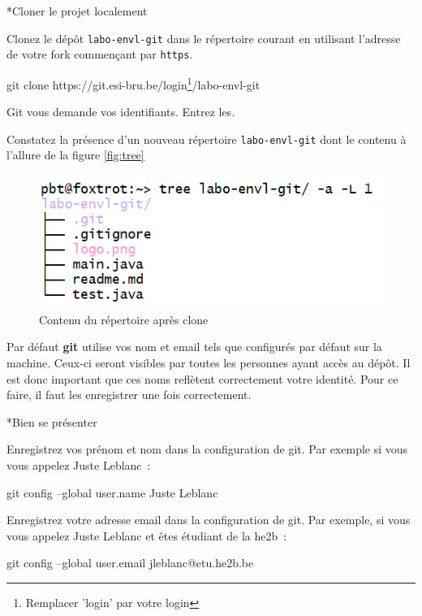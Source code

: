 \documentclass[a4paper,11pt]{style-esi/td}
\newcommand{\git}{\textbf{git }}
\begin{document}
\begin{Exercice}*{Cloner le projet localement}
	\begin{steps}
		
	\item Clonez le dépôt \texttt{labo-envl-git} dans le répertoire courant en
		utilisant l'adresse de votre fork commençant par \texttt{https}. 

		\begin{term}
			git clone https://git.esi-bru.be/login\footnote{Remplacer 'login' par votre login}/labo-envl-git
		\end{term}

		Git vous demande vos identifiants. Entrez les.  

	\item Constatez la présence d'un nouveau répertoire \texttt{labo-envl-git} dont le contenu à l'allure de la figure \vref{fig:tree}

		\begin{figure}[h]
			\centering
			\includegraphics[width=.7\linewidth]{img/tree.png}
			\caption{Contenu du répertoire après clone}
			\label{fig:tree}
		\end{figure}
	
	\end{steps}
\end{Exercice}

Par défaut \git utilise vos nom et email tels que configurés par défaut sur la
machine. Ceux-ci seront visibles par toutes les personnes ayant accès au dépôt.
Il est donc important que ces noms reflètent correctement votre identité. Pour
ce faire, il faut les enregistrer une fois correctement. 

\begin{Exercice}*{Bien se présenter}
	\begin{steps}

	\item Enregistrez vos prénom et nom dans la configuration de git. Par
		exemple si vous vous appelez Juste Leblanc~:

	\begin{term}
		git config --global user.name Juste Leblanc
	\end{term}
	
	\item Enregistrez votre adresse email dans la configuration de git. Par
		exemple, si vous vous appelez Juste Leblanc et êtes étudiant de la he2b~:

	\begin{term}
		git config --global user.email jleblanc@etu.he2b.be
	\end{term}

	\end{steps}
\end{Exercice}
\end{document}
